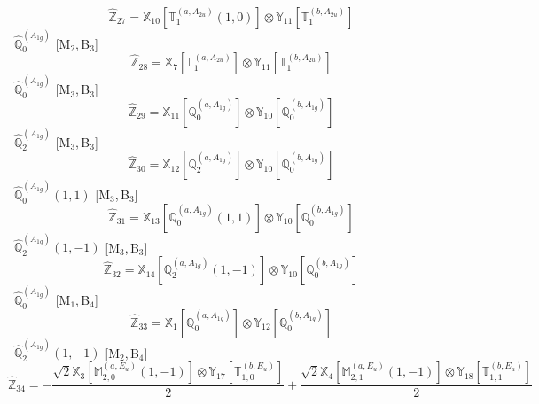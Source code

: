 \documentclass[fleqn,10pt,landscape]{article}
\begin{document}
\begin{itemize}
\begin{dmath*}
\hat{\mathbb{Z}}_{27}=\mathbb{X}_{10}[\mathbb{T}_{1}^{(a,A_{2u})}(1,0)] \otimes\mathbb{Y}_{11}[\mathbb{T}_{1}^{(b,A_{2u})}]
\end{dmath*}
\vspace{4mm}
\noindent {} $\,\,\,\hat{\mathbb{Q}}_{0}^{(A_{1g})}$ [M$_{2}$,\,B$_{3}$]
\begin{dmath*}
\hat{\mathbb{Z}}_{28}=\mathbb{X}_{7}[\mathbb{T}_{1}^{(a,A_{2u})}] \otimes\mathbb{Y}_{11}[\mathbb{T}_{1}^{(b,A_{2u})}]
\end{dmath*}
\vspace{4mm}
\noindent {} $\,\,\,\hat{\mathbb{Q}}_{0}^{(A_{1g})}$ [M$_{3}$,\,B$_{3}$]
\begin{dmath*}
\hat{\mathbb{Z}}_{29}=\mathbb{X}_{11}[\mathbb{Q}_{0}^{(a,A_{1g})}] \otimes\mathbb{Y}_{10}[\mathbb{Q}_{0}^{(b,A_{1g})}]
\end{dmath*}
\vspace{4mm}
\noindent {} $\,\,\,\hat{\mathbb{Q}}_{2}^{(A_{1g})}$ [M$_{3}$,\,B$_{3}$]
\begin{dmath*}
\hat{\mathbb{Z}}_{30}=\mathbb{X}_{12}[\mathbb{Q}_{2}^{(a,A_{1g})}] \otimes\mathbb{Y}_{10}[\mathbb{Q}_{0}^{(b,A_{1g})}]
\end{dmath*}
\vspace{4mm}
\noindent {} $\,\,\,\hat{\mathbb{Q}}_{0}^{(A_{1g})}(1,1)$ [M$_{3}$,\,B$_{3}$]
\begin{dmath*}
\hat{\mathbb{Z}}_{31}=\mathbb{X}_{13}[\mathbb{Q}_{0}^{(a,A_{1g})}(1,1)] \otimes\mathbb{Y}_{10}[\mathbb{Q}_{0}^{(b,A_{1g})}]
\end{dmath*}
\vspace{4mm}
\noindent {} $\,\,\,\hat{\mathbb{Q}}_{2}^{(A_{1g})}(1,-1)$ [M$_{3}$,\,B$_{3}$]
\begin{dmath*}
\hat{\mathbb{Z}}_{32}=\mathbb{X}_{14}[\mathbb{Q}_{2}^{(a,A_{1g})}(1,-1)] \otimes\mathbb{Y}_{10}[\mathbb{Q}_{0}^{(b,A_{1g})}]
\end{dmath*}
\vspace{4mm}
\noindent {} $\,\,\,\hat{\mathbb{Q}}_{0}^{(A_{1g})}$ [M$_{1}$,\,B$_{4}$]
\begin{dmath*}
\hat{\mathbb{Z}}_{33}=\mathbb{X}_{1}[\mathbb{Q}_{0}^{(a,A_{1g})}] \otimes\mathbb{Y}_{12}[\mathbb{Q}_{0}^{(b,A_{1g})}]
\end{dmath*}
\vspace{4mm}
\noindent {} $\,\,\,\hat{\mathbb{Q}}_{2}^{(A_{1g})}(1,-1)$ [M$_{2}$,\,B$_{4}$]
\begin{dmath*}
\hat{\mathbb{Z}}_{34}=- \frac{\sqrt{2} \mathbb{X}_{3}[\mathbb{M}_{2,0}^{(a,E_{u})}(1,-1)] \otimes\mathbb{Y}_{17}[\mathbb{T}_{1,0}^{(b,E_{u})}]}{2} + \frac{\sqrt{2} \mathbb{X}_{4}[\mathbb{M}_{2,1}^{(a,E_{u})}(1,-1)] \otimes\mathbb{Y}_{18}[\mathbb{T}_{1,1}^{(b,E_{u})}]}{2}

\end{dmath*}
\end{itemize}
\end{document}
